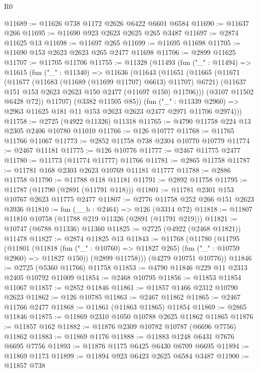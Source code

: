 \begin{lexlean}{R0}
\begin{coremodule}
@11689 := @11626 @738 @1172 @2626 @6422 @6601 @6584
@11690 := @11637 @266
@11695 := @11690 @923 @2623 @2625 @265 @3487
@11697 := @2874 @11625 @13
@11698 := @11697 @265
@11699 := @11695 @11698
@11705 := @11690 @153 @2623 @2623 @265 @2477 @11698
@11706 := @2899 @11625
@11707 := @11705 @11706
@11755 := @11328
    (@11493
      (fun ("_" : @11494) =>
      @11615
        (fun ("_" : @11340) =>
        @11636
          (@11643
            (@11651
              (@11665
                (@11671
                  (@11677 (@11683 (@11689 (@11699 @11707) @6613) @11707) @6721)
                  (@11637 @151 @153 @2623 @2623 @150 @2477 (@11697 @150) @11706)))
              (@3107 @11502 @6428 @72))
            @11707)
          (@3382 @11505 @85))
        (fun ("_" : @11339 @2960) =>
        @2963 @11625 @181 @11 @153 @2623 @2623 @2477 @2971 @11706 @2974)))
@11758 := @2725 (@4922 @11326) @11318
@11765 := @4790 @11758 @224 @13 @2305 @2406 @10780 @11010
@11766 := @126 @10777
@11768 := @11765 @11766 @11067
@11773 := @2852 @11758 @738 @2304 @10770 @10779
@11774 := @2467 @11181
@11775 := @126 @10776
@11777 := @2467 @11775 @2477
@11780 := @11773 (@11774 @11777) @11766
@11781 := @2865 @11758
@11787 := @11781 @168 @2303 @2623 @10769 @11181 @11777
@11788 := @2886 @11758
@11790 := @11788 @118 @11181
@11791 := @2892 @11758
@11795 := @11787 (@11790 (@2891 (@11791 @118)))
@11801 := @11781 @2301 @153 @10767 @2623 @11775 @2477
@11807 := @2776 @11758 @252 @266 @151 @2623 @3936
@11810 := fun (__b : @2464) => @126 (@3314 @72)
@11818 := @11807 @11810 @10758 (@11788 @219 @11326 (@2891 (@11791 @219)))
@11821 := @10747 (@6788 @11336) @11360
@11825 := @2725 (@4922 (@2468 @11821)) @11478
@11827 := @2874 @11825 @13
@11843 := @11768
    (@11780
      (@11795
        (@11801
          (@11818 (fun ("_" : @10760) => @11827 @265) (fun ("_" : @10759 @2960) => @11827 @150))
          (@2899 @11758)))
      (@4279 @10751 @10776))
@11846 := @2725 (@5360 @11766) @11758
@11853 := @4790 @11846 @229 @11 @2313 @2405 @10792 @11009
@11854 := @2468 @10795
@11856 := @11853 @11854 @11067
@11857 := @2852 @11846
@11861 := @11857 @1466 @2312 @10790 @2623
@11862 := @126 @10785
@11863 := @2467 @11862
@11865 := @2467 @11766 @2477
@11868 := @11861 (@11863 @11865) @11854
@11869 := @2865 @11846
@11875 := @11869 @2310 @1050 @10788 @2625 @11862 @11865
@11876 := @11857 @162
@11882 := @11876 @2309 @10782 @10787 (@6696 @7756) @11862
@11883 := @11869 @1176
@11888 := @11883 @1248 @6431 @7676 @6695 @7756
@11893 := @11876 @1175 @6425 @6430 @6709 @6695
@11894 := @11869 @1173
@11899 := @11894 @923 @6423 @2625 @6584 @3487
@11900 := @11857 @738

\end{coremodule}
\end{lexlean}
